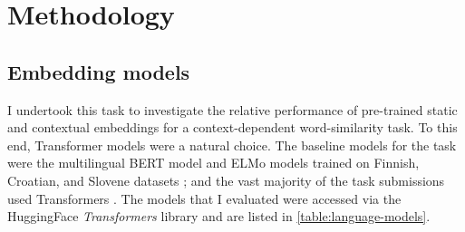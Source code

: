\section{Methodology}
\label{sec:methodology}

\subsection{Embedding models}

I undertook this task to investigate the relative performance of pre-trained static and
contextual embeddings for a context-dependent word-similarity task.
To this end, Transformer models \parencite{Vaswani2017} were a natural choice.
The baseline models for the task were the multilingual BERT model
\parencite{Devlin2019} and ELMo models \parencite{Peters2018a} trained on Finnish,
Croatian, and Slovene datasets \parencite{Ulcar2020a}; and the vast majority of the
task submissions used Transformers \parencite[36,42-45]{Armendariz2020a}.
The models that I evaluated were accessed via the HuggingFace \emph{Transformers}
library \parencite{Wolf2020} and are listed in \cref{table:language-models}.

